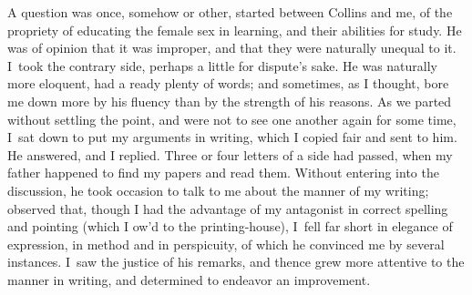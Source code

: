 {\narrower\smallskip\noindent
   A question was once, somehow or other, started between
   Collins and me, of the propriety of educating the female
   sex in learning, and their abilities for study. He was of
   opinion that it was improper, and that they were naturally
   unequal to it.  I~took the contrary side, perhaps a little for
   dispute's sake.  He was naturally more eloquent, had a
   ready plenty of words; and sometimes, as I thought, bore me
   down more by his fluency than by the strength of his
   reasons.  As we parted without settling the point, and were
   not to see one another again for some time, I~sat down to
   put my arguments in writing, which I copied fair and sent
   to him.  He answered, and I replied.  Three or four
   letters of a side had passed, when my father happened to
   find my papers and read them.  Without entering into the
   discussion, he took occasion to talk to me about the manner
   of my writing; observed that, though I had the advantage of
   my antagonist in correct spelling and pointing (which I
   ow'd to the printing-house), I~fell far short in elegance
   of expression, in method and in perspicuity, of which he
   convinced me by several instances.  I~saw the justice of
   his remarks, and thence grew more attentive to the manner in
   writing, and determined to endeavor an improvement.
   
}
